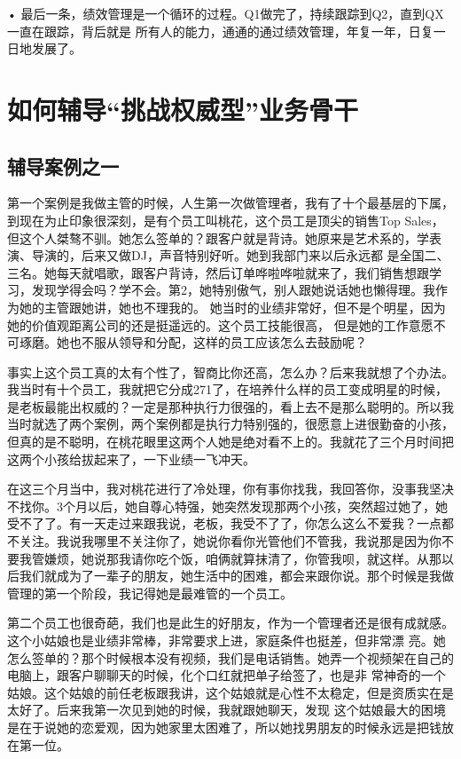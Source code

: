 \documentclass[12pt]{article}
\begin{document}
• 最后一条，绩效管理是一个循环的过程。Q1做完了，持续跟踪到Q2，直到QX一直在跟踪，背后就是 所有人的能力，通通的通过绩效管理，年复一年，日复一日地发展了。

\section{如何辅导“挑战权威型”业务骨干}
\subsection{辅导案例之一}
第一个案例是我做主管的时候，人生第一次做管理者，我有了十个最基层的下属，到现在为止印象很深刻，是有个员工叫桃花，这个员工是顶尖的销售Top Sales，但这个人桀骜不驯。她怎么签单的？跟客户就是背诗。她原来是艺术系的，学表演、导演的，后来又做DJ，声音特别好听。她到我部门来以后永远都 是全国二、三名。她每天就唱歌，跟客户背诗，然后订单哗啦哗啦就来了，我们销售想跟学习，发现学得会吗？学不会。第2，她特别傲气，别人跟她说话她也懒得理。我作为她的主管跟她讲，她也不理我的。 她当时的业绩非常好，但不是个明星，因为她的价值观距离公司的还是挺遥远的。这个员工技能很高， 但是她的工作意愿不可琢磨。她也不服从领导和分配，这样的员工应该怎么去鼓励呢？

事实上这个员工真的太有个性了，智商比你还高，怎么办？后来我就想了个办法。我当时有十个员工，我就把它分成271了，在培养什么样的员工变成明星的时候，是老板最能出权威的？一定是那种执行力很强的，看上去不是那么聪明的。所以我当时就选了两个案例，两个案例都是执行力特别强的，很愿意上进很勤奋的小孩，但真的是不聪明，在桃花眼里这两个人她是绝对看不上的。我就花了三个月时间把这两个小孩给拔起来了，一下业绩一飞冲天。

在这三个月当中，我对桃花进行了冷处理，你有事你找我，我回答你，没事我坚决不找你。3个月以后，她自尊心特强，她突然发现那两个小孩，突然超过她了，她受不了了。有一天走过来跟我说，老板，我受不了了，你怎么这么不爱我？一点都不关注。我说我哪里不关注你了，她说你看你光管他们不管我，我说那是因为你不要我管嫌烦，她说那我请你吃个饭，咱俩就算抹清了，你管我呗，就这样。从那以后我们就成为了一辈子的朋友，她生活中的困难，都会来跟你说。那个时候是我做管理的第一个阶段，我记得她是最难管的一个员工。

第二个员工也很奇葩，我们也是此生的好朋友，作为一个管理者还是很有成就感。这个小姑娘也是业绩非常棒，非常要求上进，家庭条件也挺差，但非常漂 亮。她怎么签单的？那个时候根本没有视频，我们是电话销售。她弄一个视频架在自己的电脑上，跟客户聊聊天的时候，化个口红就把单子给签了，也是非 常神奇的一个姑娘。这个姑娘的前任老板跟我讲，这个姑娘就是心性不太稳定，但是资质实在是太好了。后来我第一次见到她的时候，我就跟她聊天，发现 这个姑娘最大的困境是在于说她的恋爱观，因为她家里太困难了，所以她找男朋友的时候永远是把钱放在第一位。
\end{document}
